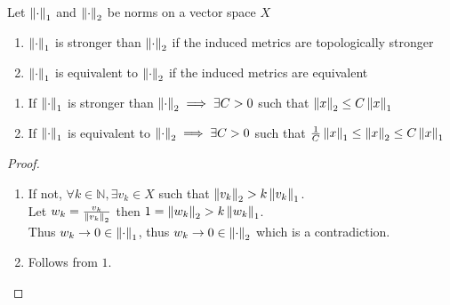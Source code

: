 \documentclass[../main.tex]{subfiles}
\begin{document}
\begin{defn}
	Let $\left\lVert\cdot\right\rVert_1$ and $\left\lVert\cdot\right\rVert_2$ be norms on a vector space $X$ 
	\begin{enumerate}
		\item $\left\lVert\cdot\right\rVert_1$ is stronger than $\left\lVert\cdot\right\rVert_2$ if the induced metrics are topologically stronger
		\item $\left\lVert\cdot\right\rVert_1$ is equivalent to $\left\lVert\cdot\right\rVert_2$ if the induced metrics are equivalent
	\end{enumerate}
\end{defn}
\begin{lemma}
\begin{enumerate}
	\item If $\left\lVert\cdot\right\rVert_1$ is stronger than $\left\lVert\cdot\right\rVert_2 \implies \exists C>0 $ such that $\left\lVert x\right\rVert_2 \leq C \left\lVert x\right\rVert_1$ 
	\item If $\left\lVert\cdot\right\rVert_1$ is equivalent to $\left\lVert\cdot\right\rVert_2 \implies \exists C>0 $ such that $\frac{1}{C}\left\lVert x\right\rVert_1 \leq \left\lVert x\right\rVert_2 \leq C \left\lVert x\right\rVert_1$ 
\end{enumerate}
\end{lemma}
\begin{proof}
\begin{enumerate}
	\item If not, $\forall k \in \mathbb{N}, \exists v_k \in X$ such that $\left\lVert v_k\right\rVert_2 > k \left\lVert v_k\right\rVert_1$.\\
		Let $w_k = \frac{v_k}{\left\lVert v_k\right\rVert_2}$ then $1= \left\lVert w_k\right\rVert_2 > k \left\lVert w_k\right\rVert_1$.\\
		Thus $w_k \to 0\in \left\lVert\cdot\right\rVert_1$, thus $w_k \to 0\in \left\lVert\cdot\right\rVert_2$ which is a contradiction.
	\item Follows from $1$.
\end{enumerate}

\end{proof}
\end{document}
